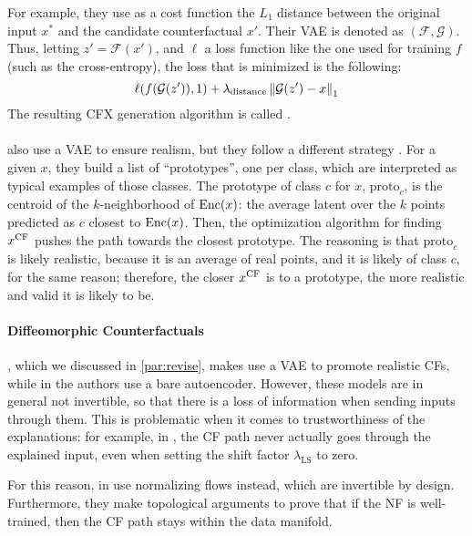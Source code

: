 \documentclass[../main.tex]{subfiles}
\begin{document}
For example, they use as a cost function the $L_1$ distance between the original input $x^{*}$ and the candidate counterfactual $x'$.
Their VAE is denoted as $(\mathcal{F}, \mathcal{G})$.
Thus, letting $z' = \mathcal{F}(x')$, and $\ell$ a loss function like the one used for training $f$ (such as the cross-entropy), the loss that is minimized is the following:
\begin{equation}
	\ell(f(\mathcal{G}(z')), 1)
	+ \lambda_\text{distance} \left\lVert\mathcal{G}(z') - x\right\rVert_1
\end{equation}
The resulting CFX generation algorithm is called \revise{} \cite{joshiRealistic2019}.

\paragraph{}

\citeauthor{vanlooverenInterpretable2021} also use a VAE to ensure realism, but they follow a different strategy \cite{vanlooverenInterpretable2021}.
For a given $x$, they build a list of ``prototypes'', one per class, which are interpreted as typical examples of those classes.
The prototype of class $c$ for $x$, $\text{proto}_c$, is the centroid of the $k$-neighborhood of $\operatorname{Enc}(x)$: the average latent over the $k$ points predicted as $c$ closest to $\operatorname{Enc}(x)$.
Then, the optimization algorithm for finding $x^\mathrm{CF}$ pushes the path towards the closest prototype.
The reasoning is that $\text{proto}_c$ is likely realistic, because it is an average of real points, and it is likely of class $c$, for the same reason; therefore, the closer $x^\mathrm{CF}$ is to a prototype, the more realistic and valid it is likely to be.

\paragraph{Diffeomorphic Counterfactuals}
\label{previous_work:diffeo}

\revise{}, which we discussed in \autoref{par:revise}, makes use a VAE to promote realistic CFs, while in \ls{} the authors use a bare autoencoder.
However, these models are in general not invertible, so that there is a loss of information when sending inputs through them.
This is problematic when it comes to trustworthiness of the explanations: for example, in \ls{}, the CF path never actually goes through the explained input, even when setting the shift factor $\lambda_\text{LS}$ to zero.

For this reason, in \cite{dombrowskiDiffeomorphic2021} \citeauthor{dombrowskiDiffeomorphic2021} use normalizing flows instead, which are invertible by design.
Furthermore, they make topological arguments to prove that if the NF is well-trained, then the CF path stays within the data manifold.
\end{document}
